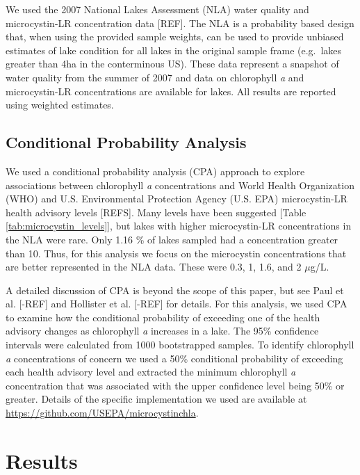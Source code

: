 \documentclass[11pt,]{article}
\begin{document}
We used the 2007 National Lakes Assessment (NLA) water quality and
microcystin-LR concentration data {[}REF{]}. The NLA is a probability
based design that, when using the provided sample weights, can be used
to provide unbiased estimates of lake condition for all lakes in the
original sample frame (e.g.~lakes greater than 4ha in the conterminous
US). These data represent a snapshot of water quality from the summer of
2007 and data on chlorophyll \emph{a} and microcystin-LR concentrations
are available for lakes. All results are reported using weighted
estimates.

\subsection{Conditional Probability
Analysis}\label{conditional-probability-analysis}

We used a conditional probability analysis (CPA) approach to explore
associations between chlorophyll \emph{a} concentrations and World
Health Organization (WHO) and U.S. Environmental Protection Agency (U.S.
EPA) microcystin-LR health advisory levels {[}REFS{]}. Many levels have
been suggested {[}Table \ref{tab:microcystin_levels}{]}, but lakes with
higher microcystin-LR concentrations in the NLA were rare. Only 1.16 \%
of lakes sampled had a concentration greater than 10. Thus, for this
analysis we focus on the microcystin concentrations that are better
represented in the NLA data. These were 0.3, 1, 1.6, and 2 \(\mu\)g/L.

A detailed discussion of CPA is beyond the scope of this paper, but see
Paul et al. {[}-REF{]} and Hollister et al. {[}-REF{]} for details. For
this analysis, we used CPA to examine how the conditional probability of
exceeding one of the health advisory changes as chlorophyll \emph{a}
increases in a lake. The 95\% confidence intervals were calculated from
1000 bootstrapped samples. To identify chlorophyll \emph{a}
concentrations of concern we used a 50\% conditional probability of
exceeding each health advisory level and extracted the minimum
chlorophyll \emph{a} concentration that was associated with the upper
confidence level being 50\% or greater. Details of the specific
implementation we used are available at
\url{https://github.com/USEPA/microcystinchla}.

\section{Results}\label{results}
\end{document}

